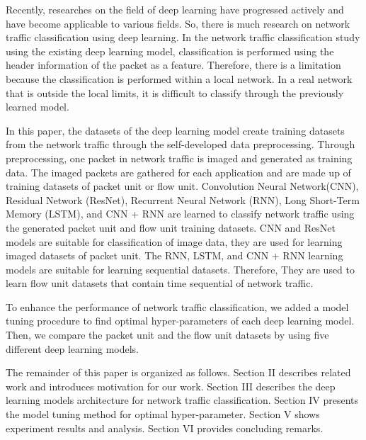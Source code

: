 Recently, researches on the field of deep learning have progressed actively and have become applicable to various fields.
So, there is much research on network traffic classification using deep learning.
In the network traffic classification study using the existing deep learning model, classification is performed using the header information of the packet as a feature.
Therefore, there is a limitation because the classification is performed within a local network.
In a real network that is outside the local limits, it is difficult to classify through the previously learned model.

In this paper, the datasets of the deep learning model create training datasets from the network traffic through the self-developed data preprocessing.
Through preprocessing, one packet in network traffic is imaged and generated as training data.
The imaged packets are gathered for each application and are made up of training datasets of packet unit or flow unit.
Convolution Neural Network(CNN), Residual Network (ResNet), Recurrent Neural Network (RNN), Long Short-Term Memory (LSTM), and CNN + RNN are learned to classify network traffic using the generated packet unit and flow unit training datasets.
CNN and ResNet models are suitable for classification of image data, they are used for learning imaged datasets of packet unit.
The RNN, LSTM, and CNN + RNN learning models are suitable for learning sequential datasets.
Therefore, They are used to learn flow unit datasets that contain time sequential of network traffic.

To enhance the performance of network traffic classification, we added a model tuning procedure to find optimal hyper-parameters of each deep learning model.
Then, we compare the packet unit and the flow unit datasets by using five different deep learning models.

The remainder of this paper is organized as follows.
Section II describes related work and introduces motivation for our work.
Section III describes the deep learning models architecture for network traffic classification.
Section IV presents the model tuning method for optimal hyper-parameter.
Section V shows experiment results and analysis.
Section VI provides concluding remarks.